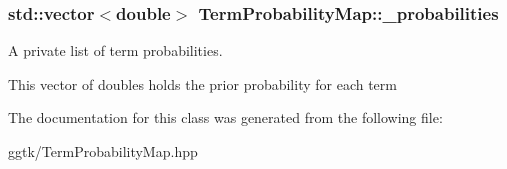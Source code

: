 \subsubsection[{\texorpdfstring{\+\_\+probabilities}{_probabilities}}]{\setlength{\rightskip}{0pt plus 5cm}std\+::vector$<$double$>$ Term\+Probability\+Map\+::\+\_\+probabilities\hspace{0.3cm}{\ttfamily [protected]}}\hypertarget{classTermProbabilityMap_a1cbbbb63e115e69359e2d4fb65be6227}{}\label{classTermProbabilityMap_a1cbbbb63e115e69359e2d4fb65be6227}


A private list of term probabilities. 

This vector of doubles holds the prior probability for each term 

The documentation for this class was generated from the following file\+:\begin{DoxyCompactItemize}
\item 
ggtk/Term\+Probability\+Map.\+hpp\end{DoxyCompactItemize}
